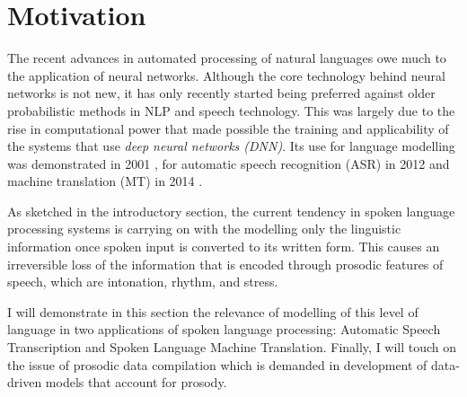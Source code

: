 
\section{Motivation}


The recent advances in automated processing of natural languages owe much to the application of neural networks. Although the core technology behind neural networks is not new, it has only recently started being preferred against older probabilistic methods in NLP and speech technology. This was largely due to the rise in computational power that made possible the training and applicability of the systems that use \textit{deep neural networks (DNN)}. Its use for language modelling was demonstrated in 2001 \citep{Bengio:LM}, for automatic speech recognition (ASR) in 2012 \citep{asr_dnnhmm} and machine translation (MT) in 2014 \citep{sutskever}. %

As sketched in the introductory section, the current tendency in spoken language processing systems is carrying on with the modelling only the linguistic information once spoken input is converted to its written form. This causes an irreversible loss of the information that is encoded through prosodic features of speech, which are intonation, rhythm, and stress. 

I will demonstrate in this section the relevance of modelling of this level of language in two applications of spoken language processing: Automatic Speech Transcription and Spoken Language Machine Translation. Finally, I will touch on the issue of prosodic data compilation which is demanded in development of data-driven models that account for prosody. 

